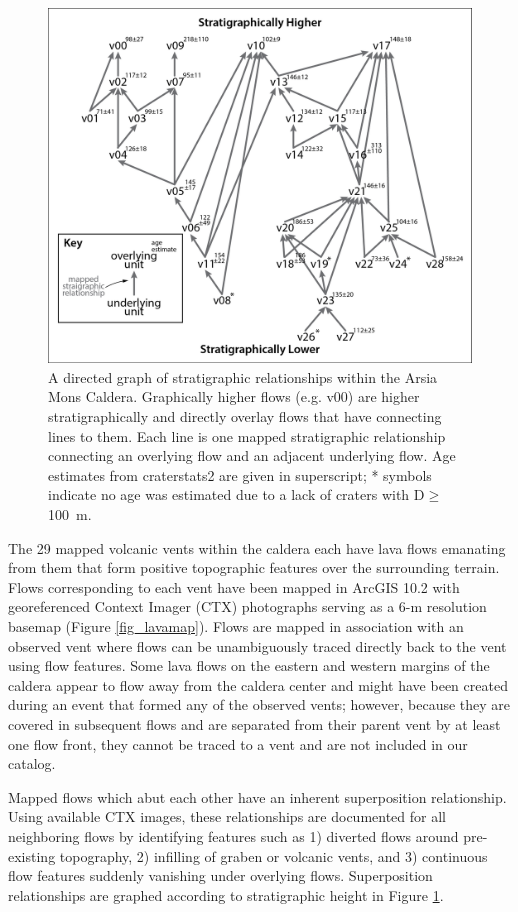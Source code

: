 \documentclass[12pt,letter]{article}
\begin{document}
\begin{figure}[h]
\centering
\includegraphics[width=0.7\linewidth]{figures/stratigraphy_web_300dpi.png}
\caption{A directed graph of stratigraphic relationships within the Arsia Mons Caldera. Graphically higher flows (e.g. v00) are higher stratigraphically and directly overlay flows that have connecting lines to them. Each line is one mapped stratigraphic relationship connecting an overlying flow and an adjacent underlying flow. Age estimates from craterstats2 are given in superscript; * symbols indicate no age was estimated due to a lack of craters with D$\ge$100~m.}
\label{fig_stratweb}
\end{figure}

The 29 mapped volcanic vents within the caldera each have lava flows emanating from them that form positive topographic features over the surrounding terrain. Flows corresponding to each vent have been mapped in ArcGIS 10.2 with georeferenced Context Imager (CTX) photographs \citep{malin2007context} serving as a 6-m resolution basemap (Figure \ref{fig_lavamap}). Flows are mapped in association with an observed vent where flows can be unambiguously traced directly back to the vent using flow features. Some lava flows on the eastern and western margins of the caldera appear to flow away from the caldera center and might have been created during an event that formed any of the observed vents; however, because they are covered in subsequent flows and are separated from their parent vent by at least one flow front, they cannot be traced to a vent and are not included in our catalog.

Mapped flows which abut each other have an inherent superposition relationship. Using available CTX images, these relationships are documented for all neighboring flows by identifying features such as 1) diverted flows around pre-existing topography, 2) infilling of graben or volcanic vents, and 3) continuous flow features suddenly vanishing under overlying flows. Superposition relationships are graphed according to stratigraphic height in Figure \ref{fig_stratweb}.
\end{document}
